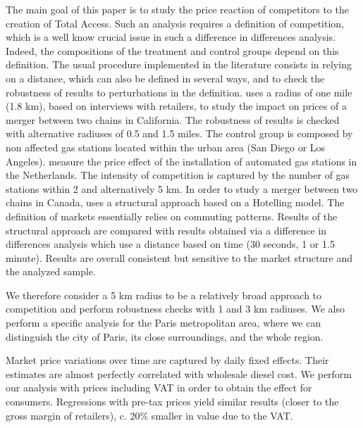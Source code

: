 \documentclass[english]{article}
\begin{document}
\medskip{}

The main goal of this paper is to study the price reaction of competitors to the creation of Total Access. Such an analysis requires a definition of competition, which is a well know crucial issue in such a difference in differences analysis. Indeed, the compositions of the treatment and control groups depend on this definition. The usual procedure implemented in the literature consists in relying on a distance, which can also be defined in several ways, and to check the robustness of results to perturbations in the definition. \cite{HAS04} uses a radius of one mile (1.8 km), based on interviews with retailers, to study the impact on prices of a merger between two chains in California. The robustness of results is checked with alternative radiuses of 0.5 and 1.5 miles. The control group is composed by non affected gas stations located within the urban area (San Diego or Los Angeles). \cite{BRU15} measure the price effect of the installation of automated gas stations in the Netherlands. The intensity of competition is captured by the number of gas stations within 2 and alternatively 5 km. In order to study a merger between two chains in Canada, \cite{HOU12} uses a structural approach based on a Hotelling model. The definition of markets essentially relies on commuting patterns. Results of the structural approach are compared with results obtained via a difference in differences analysis which use a distance based on time (30 seconds, 1 or 1.5 minute). Results are overall consistent but sensitive to the market structure and the analyzed sample.

We therefore consider a 5 km radius to be a relatively broad approach to competition and perform robustness checks with 1 and 3 km radiuses. We also perform a specific analysis for the Paris metropolitan area, where we can distinguish the city of Paris, its close surroundings, and the whole region.

Market price variations over time are captured by daily fixed effects. Their estimates are almost perfectly correlated with wholesale diesel cost. We perform our analysis with prices including VAT in order to obtain the effect for consumers. Regressions with pre-tax prices yield similar results (closer to the gross margin of retailers), c. 20\% smaller in value due to the VAT.
\medskip{}
\end{document}
